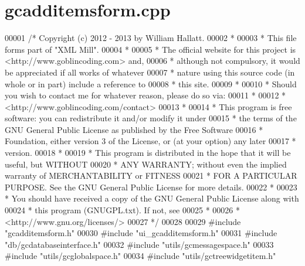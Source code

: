 \hypertarget{gcadditemsform_8cpp_source}{\section{gcadditemsform.\-cpp}
}

\begin{DoxyCode}
00001 \textcolor{comment}{/* Copyright (c) 2012 - 2013 by William Hallatt.}
00002 \textcolor{comment}{ *}
00003 \textcolor{comment}{ * This file forms part of "XML Mill".}
00004 \textcolor{comment}{ *}
00005 \textcolor{comment}{ * The official website for this project is <http://www.goblincoding.com> and,}
00006 \textcolor{comment}{ * although not compulsory, it would be appreciated if all works of whatever}
00007 \textcolor{comment}{ * nature using this source code (in whole or in part) include a reference to}
00008 \textcolor{comment}{ * this site.}
00009 \textcolor{comment}{ *}
00010 \textcolor{comment}{ * Should you wish to contact me for whatever reason, please do so via:}
00011 \textcolor{comment}{ *}
00012 \textcolor{comment}{ *                 <http://www.goblincoding.com/contact>}
00013 \textcolor{comment}{ *}
00014 \textcolor{comment}{ * This program is free software: you can redistribute it and/or modify it
       under}
00015 \textcolor{comment}{ * the terms of the GNU General Public License as published by the Free
       Software}
00016 \textcolor{comment}{ * Foundation, either version 3 of the License, or (at your option) any later}
00017 \textcolor{comment}{ * version.}
00018 \textcolor{comment}{ *}
00019 \textcolor{comment}{ * This program is distributed in the hope that it will be useful, but WITHOUT}
00020 \textcolor{comment}{ * ANY WARRANTY; without even the implied warranty of MERCHANTABILITY or
       FITNESS}
00021 \textcolor{comment}{ * FOR A PARTICULAR PURPOSE.  See the GNU General Public License for more
       details.}
00022 \textcolor{comment}{ *}
00023 \textcolor{comment}{ * You should have received a copy of the GNU General Public License along with}
00024 \textcolor{comment}{ * this program (GNUGPL.txt).  If not, see}
00025 \textcolor{comment}{ *}
00026 \textcolor{comment}{ *                    <http://www.gnu.org/licenses/>}
00027 \textcolor{comment}{ */}
00028 
00029 \textcolor{preprocessor}{#include "gcadditemsform.h"}
00030 \textcolor{preprocessor}{#include "ui\_gcadditemsform.h"}
00031 \textcolor{preprocessor}{#include "db/gcdatabaseinterface.h"}
00032 \textcolor{preprocessor}{#include "utils/gcmessagespace.h"}
00033 \textcolor{preprocessor}{#include "utils/gcglobalspace.h"}
00034 \textcolor{preprocessor}{#include "utils/gctreewidgetitem.h"}

\end{DoxyCode}
